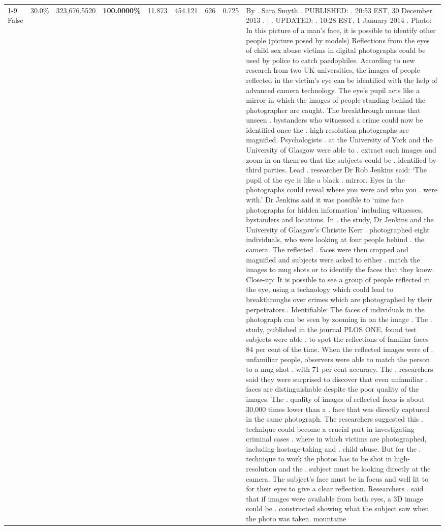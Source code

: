 \begin{table}[H]
\begin{tabular}{lllrlllll}
\cline{1-9}
False & 30.0\% & 323,676.5520 & \bfseries \color{red} 100.0000\% & 11.873 & 454.121 & 626 & 0.725 & By . Sara Smyth . PUBLISHED: . 20:53 EST, 30 December 2013 . | . UPDATED: . 10:28 EST, 1 January 2014 . Photo: In this picture of a man's face, it is possible to identify other people (picture posed by models) Reflections from the eyes of child sex abuse victims in digital photographs could be used by police to catch paedophiles. According to new research from two UK universities, the images of people reflected in the victim's eye can be identified with the help of advanced camera technology. The eye's pupil acts like a mirror in which the images of people standing behind the photographer are caught. The breakthrough means that unseen . bystanders who witnessed a crime could now be identified once the . high-resolution photographs are magnified. Psychologists . at the University of York and the University of Glasgow were able to . extract such images and zoom in on them so that the subjects could be . identified by third parties. Lead . researcher Dr Rob Jenkins said: ‘The pupil of the eye is like a black . mirror. Eyes in the photographs could reveal where you were and who you . were with.' Dr Jenkins said it was possible to ‘mine face photographs for hidden information' including witnesses, bystanders and locations. In . the study, Dr Jenkins and the University of Glasgow's Christie Kerr . photographed eight individuals, who were looking at four people behind . the camera. The reflected . faces were then cropped and magnified and subjects were asked to either . match the images to mug shots or to identify the faces that they knew. Close-up: It is possible to see a group of people reflected in the eye, using a technology which could lead to breakthroughs over crimes which are photographed by their perpetrators . Identifiable: The faces of individuals in the photograph can be seen by zooming in on the image . The . study, published in the journal PLOS ONE, found test subjects were able . to spot the reflections of familiar faces 84 per cent of the time. When the reflected images were of . unfamiliar people, observers were able to match the person to a mug shot . with 71 per cent accuracy. The . researchers said they were surprised to discover that even unfamiliar . faces are distinguishable despite the poor quality of the images. The . quality of images of reflected faces is about 30,000 times lower than a . face that was directly captured in the same photograph. The researchers suggested this . technique could become a crucial part in investigating criminal cases . where in which victims are photographed, including hostage-taking and . child abuse. But for the . technique to work the photos has to be shot in high-resolution and the . subject must be looking directly at the camera. The subject's face must be in focus and well lit to for their eyes to give a clear reflection. Researchers . said that if images were available from both eyes, a 3D image could be . constructed showing what the subject saw when the photo was taken. mountaine \\

\end{tabular}
\end{table}
